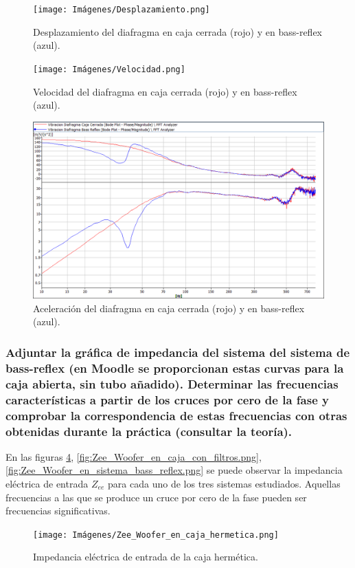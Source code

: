\documentclass[10pt]{article}
\begin{document}
\begin{figure}[htp]
  \centering
  \texttt{[image: Imágenes/Desplazamiento.png]}
  \caption{Desplazamiento del diafragma en caja cerrada (rojo) y en bass-reflex (azul).}
  \label{fig:Desplazamiento.png}
\end{figure}
\begin{figure}[htp]
  \centering
  \texttt{[image: Imágenes/Velocidad.png]}
  \caption{Velocidad del diafragma en caja cerrada (rojo) y en bass-reflex (azul).}
  \label{fig:Velocidad.png}
\end{figure}
\begin{figure}[htp]
  \centering
  \includegraphics[width=0.8\linewidth]{Imágenes/Aceleración.png}
  \caption{Aceleración del diafragma en caja cerrada (rojo) y en bass-reflex (azul).}
  \label{fig:Aceleracion.png}
\end{figure}

\subsubsection{Adjuntar la gráfica de impedancia del sistema del sistema de bass-reflex (en Moodle se proporcionan estas curvas para la caja abierta, sin tubo añadido). Determinar las frecuencias características a partir de los cruces por cero de la fase y comprobar la correspondencia de estas frecuencias con otras obtenidas durante la práctica (consultar la teoría).}

En las figuras \ref{fig:Zee_Woofer_en_caja_hermetica.png}, \ref{fig:Zee_Woofer_en_caja_con_filtros.png}, \ref{fig:Zee_Woofer_en_sistema_bass_reflex.png} se puede observar la impedancia eléctrica de entrada $Z_{ee}$ para cada uno de los tres sistemas estudiados. Aquellas frecuencias a las que se produce un cruce por cero de la fase pueden ser frecuencias significativas.

\begin{figure}[hbtp]
  \centering
  \texttt{[image: Imágenes/Zee\_Woofer\_en\_caja\_hermetica.png]}
  \caption{Impedancia eléctrica de entrada de la caja hermética.}
  \label{fig:Zee_Woofer_en_caja_hermetica.png}
\end{figure}
\end{document}
